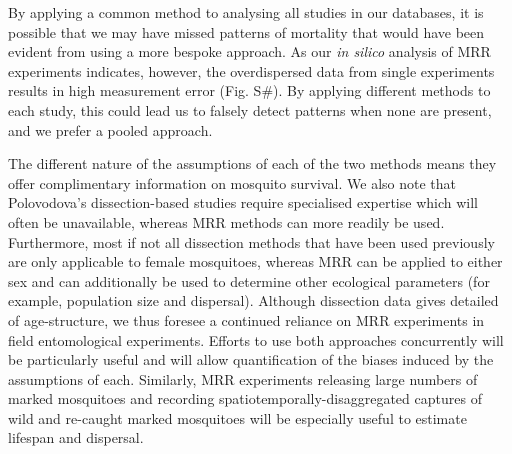 \documentclass[]{article}
\begin{document}
By applying a common method to analysing all studies in our databases,
it is possible that we may have missed patterns of mortality that would
have been evident from using a more bespoke approach. As our \emph{in
silico} analysis of MRR experiments indicates, however, the
overdispersed data from single experiments results in high measurement
error (Fig. S\#). By applying different methods to each study, this
could lead us to falsely detect patterns when none are present, and we
prefer a pooled approach.

The different nature of the assumptions of each of the two methods means
they offer complimentary information on mosquito survival. We also note
that Polovodova's dissection-based studies require specialised expertise
which will often be unavailable, whereas MRR methods can more readily be
used. Furthermore, most if not all dissection methods that have been
used previously are only applicable to female mosquitoes, whereas MRR
can be applied to either sex and can additionally be used to determine
other ecological parameters (for example, population size and
dispersal). Although dissection data gives detailed of age-structure, we
thus foresee a continued reliance on MRR experiments in field
entomological experiments. Efforts to use both approaches concurrently
will be particularly useful and will allow quantification of the biases
induced by the assumptions of each. Similarly, MRR experiments releasing
large numbers of marked mosquitoes and recording
spatiotemporally-disaggregated captures of wild and re-caught marked
mosquitoes will be especially useful to estimate lifespan and dispersal.
\end{document}
